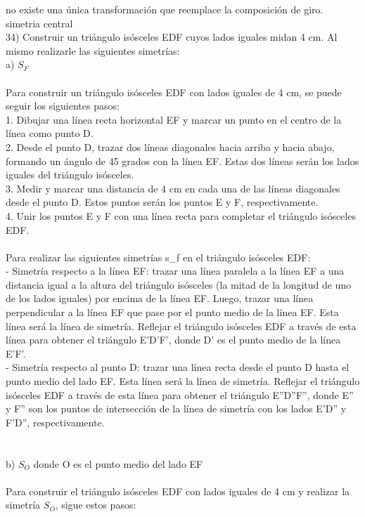 \documentclass{article}
\begin{document}
no existe una única transformación que reemplace la composición de giro.\\
{\large simetria central}
\\
34) Construir un triángulo isósceles EDF cuyos lados iguales midan 4 cm. Al mismo realizarle las siguientes simetrías:\\
a) $S_F$\\
\\
Para construir un triángulo isósceles EDF con lados iguales de 4 cm, se puede seguir los siguientes pasos:\\
1. Dibujar una línea recta horizontal EF y marcar un punto en el centro de la línea como punto D.\\
2. Desde el punto D, trazar dos líneas diagonales hacia arriba y hacia abajo, formando un ángulo de 45 grados con la línea EF. Estas dos líneas serán los lados iguales del triángulo isósceles.\\
3. Medir y marcar una distancia de 4 cm en cada una de las líneas diagonales desde el punto D. Estos puntos serán los puntos E y F, respectivamente.\\
4. Unir los puntos E y F con una línea recta para completar el triángulo isósceles EDF.\\
\\
Para realizar las siguientes simetrías s\_f en el triángulo isósceles EDF:\\
- Simetría respecto a la línea EF: trazar una línea paralela a la línea EF a una distancia igual a la altura del triángulo isósceles (la mitad de la longitud de uno de los lados iguales) por encima de la línea EF. Luego, trazar una línea perpendicular a la línea EF que pase por el punto medio de la línea EF. Esta línea será la línea de simetría. Reflejar el triángulo isósceles EDF a través de esta línea para obtener el triángulo E'D'F', donde D' es el punto medio de la línea E'F'.\\
- Simetría respecto al punto D: trazar una línea recta desde el punto D hasta el punto medio del lado EF. Esta línea será la línea de simetría. Reflejar el triángulo isósceles EDF a través de esta línea para obtener el triángulo E''D''F'', donde E'' y F'' son los puntos de intersección de la línea de simetría con los lados E'D'' y F'D'', respectivamente.\\
\\ \\
b) $S_O$ donde O es el punto medio del lado EF\\\\
Para construir el triángulo isósceles EDF con lados iguales de 4 cm y realizar la simetría $S_O$, sigue estos pasos:\\
\end{document}
